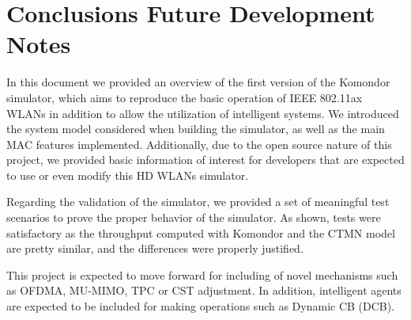 \documentclass[a4paper]{article}
\begin{document}
\section{Conclusions Future Development Notes}
\label{section:conclusions}
In this document we provided an overview of the first version of the Komondor simulator, which aims to reproduce the basic operation of IEEE 802.11ax WLANs in addition to allow the utilization of intelligent systems. We introduced the system model considered when building the simulator, as well as the main MAC features implemented. Additionally, due to the open source nature of this project, we provided basic information of interest for developers that are expected to use or even modify this HD WLANs simulator.

Regarding the validation of the simulator, we provided a set of meaningful test scenarios to prove the proper behavior of the simulator. As shown, tests were satisfactory as the throughput computed with Komondor and the CTMN model are pretty similar, and the differences were properly justified.

This project is expected to move forward for including of novel mechanisms such as OFDMA, MU-MIMO, TPC or  CST adjustment. In addition, intelligent agents are expected to be included for making operations such as Dynamic CB (DCB).



\end{document}
